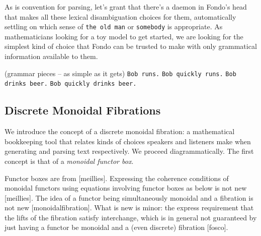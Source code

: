\begin{fullwidth}
\begin{example}
\end{example}

As is convention for parsing, let's grant that there's a daemon in Fondo's head that makes all these lexical disambiguation choices for them, automatically settling on which sense of \texttt{the old man} or \texttt{somebody} is appropriate. As mathematicians looking for a toy model to get started, we are looking for the simplest kind of choice that Fondo can be trusted to make with only grammatical information available to them.


\begin{example}
(grammar pieces -- as simple as it gets)
\texttt{Bob runs.}
\texttt{Bob quickly runs.}
\texttt{Bob drinks beer.}
\texttt{Bob quickly drinks beer.}

\end{example}

\end{fullwidth}

\subsection{Discrete Monoidal Fibrations}

We introduce the concept of a discrete monoidal fibration: a mathematical bookkeeping tool that relates kinds of choices speakers and listeners make when generating and parsing text respectively. We proceed diagrammatically. The first concept is that of a \emph{monoidal functor box}.

\begin{scholium}
Functor boxes are from [meillies]. Expressing the coherence conditions of monoidal functors using equations involving functor boxes as below is not new [meillies].
The idea of a functor being simultaneously monoidal and a fibration is not new [monoidalfibration]. What is new is minor: the express requirement that the lifts of the fibration satisfy interchange, which is in general not guaranteed by just having a functor be monoidal and a (even discrete) fibration [fosco].
\end{scholium}

